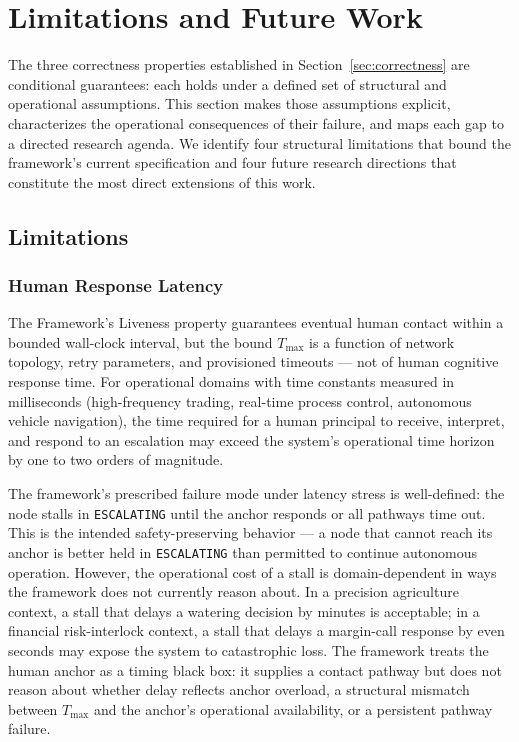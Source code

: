 \section{Limitations and Future Work}\label{sec:limitations}

The three correctness properties established in Section~\ref{sec:correctness} are
conditional guarantees: each holds under a defined set of structural and
operational assumptions.  This section makes those assumptions explicit,
characterizes the operational consequences of their failure, and maps each
gap to a directed research agenda.  We identify four structural limitations
that bound the framework's current specification and four future research
directions that constitute the most direct extensions of this work.

\subsection{Limitations}\label{sec:limitations:subsection}

\subsubsection{Human Response Latency}\label{sec:human-response-latency}

The \bxthree{} Framework's Liveness property guarantees eventual human contact
within a bounded wall-clock interval, but the bound $T_{\max}$ is a function of
network topology, retry parameters, and provisioned timeouts --- not of human
cognitive response time.  For operational domains with time constants measured
in milliseconds (high-frequency trading, real-time process control, autonomous
vehicle navigation), the time required for a human principal to receive,
interpret, and respond to an escalation may exceed the system's operational
time horizon by one to two orders of magnitude.

The framework's prescribed failure mode under latency stress is well-defined:
the node stalls in \texttt{ESCALATING} until the anchor responds or all
pathways time out.  This is the intended safety-preserving behavior ---
a node that cannot reach its anchor is better held in \texttt{ESCALATING}
than permitted to continue autonomous operation.  However, the operational
cost of a stall is domain-dependent in ways the framework does not currently
reason about.  In a precision agriculture context, a stall that delays a
watering decision by minutes is acceptable; in a financial risk-interlock
context, a stall that delays a margin-call response by even seconds may expose
the system to catastrophic loss.  The framework treats the human anchor as a
timing black box: it supplies a contact pathway but does not reason about
whether delay reflects anchor overload, a structural mismatch between $T_{\max}$
and the anchor's operational availability, or a persistent pathway failure.

